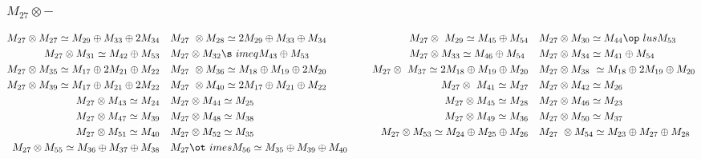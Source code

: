 \subsubsection{$M_27\otimes -$}
\begin{align*}
M_{27} \otimes M_{27} \simeq M_{29} \oplus M_{33} \oplus 2 M_{34} &&& M_{27} \
\otimes M_{28} \simeq 2 M_{29} \oplus M_{33} \oplus M_{34} &&& M_{27} \otimes \
M_{29} \simeq M_{45} \oplus M_{54} &&& M_{27} \otimes M_{30} \simeq M_{44} \op\
lus M_{53}\\
M_{27} \otimes M_{31} \simeq M_{42} \oplus M_{53} &&& M_{27} \otimes M_{32} \s\
imeq M_{43} \oplus M_{53} &&& M_{27} \otimes M_{33} \simeq M_{46} \oplus M_{54\
} &&& M_{27} \otimes M_{34} \simeq M_{41} \oplus M_{54}\\
M_{27} \otimes M_{35} \simeq M_{17} \oplus 2 M_{21} \oplus M_{22} &&& M_{27} \
\otimes M_{36} \simeq M_{18} \oplus M_{19} \oplus 2 M_{20} &&& M_{27} \otimes \
M_{37} \simeq 2 M_{18} \oplus M_{19} \oplus M_{20} &&& M_{27} \otimes M_{38} \
\simeq M_{18} \oplus 2 M_{19} \oplus M_{20}\\
M_{27} \otimes M_{39} \simeq M_{17} \oplus M_{21} \oplus 2 M_{22} &&& M_{27} \
\otimes M_{40} \simeq 2 M_{17} \oplus M_{21} \oplus M_{22} &&& M_{27} \otimes \
M_{41} \simeq M_{27} &&& M_{27} \otimes M_{42} \simeq M_{26}\\
M_{27} \otimes M_{43} \simeq M_{24} &&& M_{27} \otimes M_{44} \simeq M_{25} &&\
& M_{27} \otimes M_{45} \simeq M_{28} &&& M_{27} \otimes M_{46} \simeq M_{23}\
\\
M_{27} \otimes M_{47} \simeq M_{39} &&& M_{27} \otimes M_{48} \simeq M_{38} &&\
& M_{27} \otimes M_{49} \simeq M_{36} &&& M_{27} \otimes M_{50} \simeq M_{37}\
\\
M_{27} \otimes M_{51} \simeq M_{40} &&& M_{27} \otimes M_{52} \simeq M_{35} &&\
& M_{27} \otimes M_{53} \simeq M_{24} \oplus M_{25} \oplus M_{26} &&& M_{27} \
\otimes M_{54} \simeq M_{23} \oplus M_{27} \oplus M_{28}\\
M_{27} \otimes M_{55} \simeq M_{36} \oplus M_{37} \oplus M_{38} &&& M_{27} \ot\
imes M_{56} \simeq M_{35} \oplus M_{39} \oplus M_{40}\\
\end{align*}

